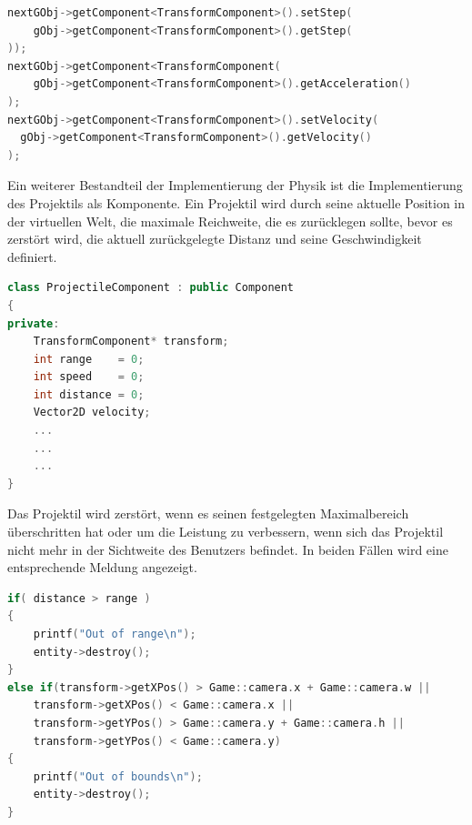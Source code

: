 \documentclass[
  10pt,
  a4paper,
  oneside,
  headers,
  headinclude,
  footinclude,
  BCOR5mm,
]{article}
\begin{document}
\begin{lstlisting}[language=C++]
nextGObj->getComponent<TransformComponent>().setStep(
    gObj->getComponent<TransformComponent>().getStep(
));
nextGObj->getComponent<TransformComponent(
    gObj->getComponent<TransformComponent>().getAcceleration()
);
nextGObj->getComponent<TransformComponent>().setVelocity(
  gObj->getComponent<TransformComponent>().getVelocity()
);
\end{lstlisting}

Ein weiterer Bestandteil der Implementierung der Physik ist die Implementierung
des Projektils als Komponente. Ein Projektil wird durch seine aktuelle Position
in der virtuellen Welt, die maximale Reichweite, die es zurücklegen sollte,
bevor es zerstört wird, die aktuell zurückgelegte Distanz und seine
Geschwindigkeit definiert.

\begin{lstlisting}[language=C++]
class ProjectileComponent : public Component
{
private:
    TransformComponent* transform;
    int range    = 0;
    int speed    = 0;
    int distance = 0;
    Vector2D velocity;
    ...
    ...
    ...
}
\end{lstlisting}

Das Projektil wird zerstört, wenn es seinen festgelegten Maximalbereich
überschritten hat oder um die Leistung zu verbessern, wenn sich das Projektil
nicht mehr in der Sichtweite des Benutzers befindet. In beiden Fällen wird eine
entsprechende Meldung angezeigt.

\begin{lstlisting}[language=C++]
if( distance > range )
{
    printf("Out of range\n");
    entity->destroy();
}
else if(transform->getXPos() > Game::camera.x + Game::camera.w ||
    transform->getXPos() < Game::camera.x ||
    transform->getYPos() > Game::camera.y + Game::camera.h ||
    transform->getYPos() < Game::camera.y)
{
    printf("Out of bounds\n");
    entity->destroy();
}
\end{lstlisting}
\end{document}
